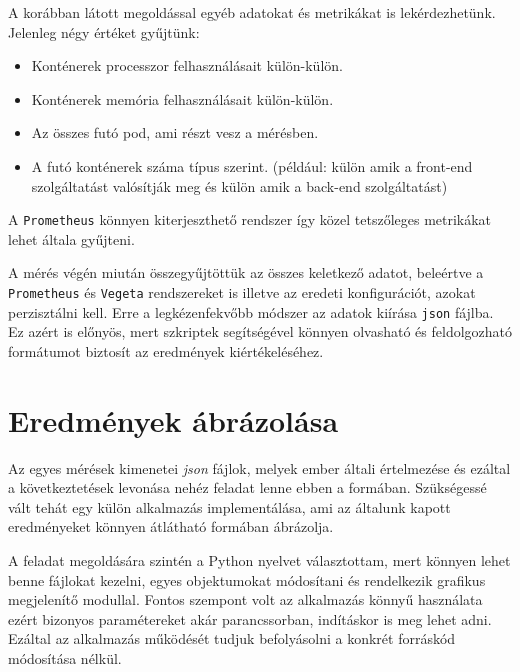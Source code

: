 

A korábban látott megoldással egyéb adatokat és metrikákat is lekérdezhetünk. 
Jelenleg négy értéket gyűjtünk:
\begin{itemize}
  \item Konténerek processzor felhasználásait külön-külön.
  \item Konténerek memória felhasználásait külön-külön.
  \item Az összes futó pod, ami részt vesz a mérésben.
  \item A futó konténerek száma típus szerint. (például: külön amik a front-end szolgáltatást valósítják meg és külön amik a back-end szolgáltatást)
\end{itemize}

A \verb+Prometheus+ könnyen kiterjeszthető rendszer így közel tetszőleges metrikákat lehet általa gyűjteni. 

A mérés végén miután összegyűjtöttük az összes keletkező adatot, beleértve a \verb+Prometheus+ és \verb+Vegeta+ rendszereket is illetve az eredeti konfigurációt, azokat perzisztálni kell.
Erre a legkézenfekvőbb módszer az adatok kiírása \verb+json+ fájlba.
Ez azért is előnyös, mert szkriptek segítségével könnyen olvasható és feldolgozható formátumot biztosít az eredmények kiértékeléséhez. 

\section{Eredmények ábrázolása}
Az egyes mérések kimenetei \textit{json} fájlok, melyek ember általi értelmezése és ezáltal a következtetések levonása nehéz feladat lenne ebben a formában. 
Szükségessé vált tehát egy külön alkalmazás implementálása, ami az általunk kapott eredményeket könnyen átlátható formában ábrázolja. 

A feladat megoldására szintén a Python nyelvet választottam, mert könnyen lehet benne fájlokat kezelni, egyes objektumokat módosítani és rendelkezik grafikus megjelenítő modullal.
Fontos szempont volt az alkalmazás könnyű használata ezért bizonyos paramétereket akár parancssorban, indításkor is meg lehet adni. 
Ezáltal az alkalmazás működését tudjuk befolyásolni a konkrét forráskód módosítása nélkül.

